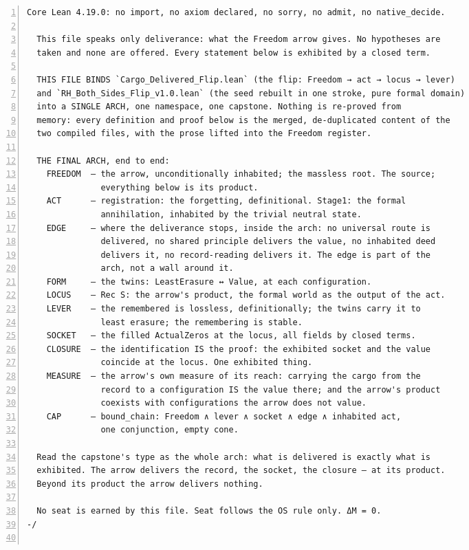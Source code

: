 \documentclass[10pt]{article}
\newcommand{\leansize}{\fontsize{5.5pt}{6.75pt}\selectfont}
\begin{document}
\begin{multicols}{2}
\begin{Verbatim}[numbers=left,firstnumber=1,numbersep=3pt,xleftmargin=2.6em,breaklines=true,breakanywhere=true,breakautoindent=false,breakindent=1.4em,breaksymbolleft={},breakanywheresymbolpre={},fontsize=\leansize]
  Core Lean 4.19.0: no import, no axiom declared, no sorry, no admit, no native_decide.

  This file speaks only deliverance: what the Freedom arrow gives. No hypotheses are
  taken and none are offered. Every statement below is exhibited by a closed term.

  THIS FILE BINDS `Cargo_Delivered_Flip.lean` (the flip: Freedom → act → locus → lever)
  and `RH_Both_Sides_Flip_v1.0.lean` (the seed rebuilt in one stroke, pure formal domain)
  into a SINGLE ARCH, one namespace, one capstone. Nothing is re-proved from
  memory: every definition and proof below is the merged, de-duplicated content of the
  two compiled files, with the prose lifted into the Freedom register.

  THE FINAL ARCH, end to end:
    FREEDOM  — the arrow, unconditionally inhabited; the massless root. The source;
               everything below is its product.
    ACT      — registration: the forgetting, definitional. Stage1: the formal
               annihilation, inhabited by the trivial neutral state.
    EDGE     — where the deliverance stops, inside the arch: no universal route is
               delivered, no shared principle delivers the value, no inhabited deed
               delivers it, no record-reading delivers it. The edge is part of the
               arch, not a wall around it.
    FORM     — the twins: LeastErasure ↔ Value, at each configuration.
    LOCUS    — Rec S: the arrow's product, the formal world as the output of the act.
    LEVER    — the remembered is lossless, definitionally; the twins carry it to
               least erasure; the remembering is stable.
    SOCKET   — the filled ActualZeros at the locus, all fields by closed terms.
    CLOSURE  — the identification IS the proof: the exhibited socket and the value
               coincide at the locus. One exhibited thing.
    MEASURE  — the arrow's own measure of its reach: carrying the cargo from the
               record to a configuration IS the value there; and the arrow's product
               coexists with configurations the arrow does not value.
    CAP      — bound_chain: Freedom ∧ lever ∧ socket ∧ edge ∧ inhabited act,
               one conjunction, empty cone.

  Read the capstone's type as the whole arch: what is delivered is exactly what is
  exhibited. The arrow delivers the record, the socket, the closure — at its product.
  Beyond its product the arrow delivers nothing.

  No seat is earned by this file. Seat follows the OS rule only. ΔM = 0.
-/


\end{Verbatim}
\end{multicols}
\end{document}
